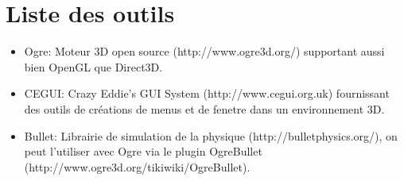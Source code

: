 \documentclass{report}
\begin{document}
    \section{Liste des outils}
    \begin{itemize}
        \item Ogre: Moteur 3D open source (http://www.ogre3d.org/) supportant aussi bien OpenGL que Direct3D. 
        \item CEGUI: Crazy Eddie's GUI System (http://www.cegui.org.uk) fournissant des outils de créations de menus et de fenetre dans un environnement 3D.
        \item Bullet: Librairie de simulation de la physique (http://bulletphysics.org/), on peut l'utiliser avec Ogre via le plugin OgreBullet (http://www.ogre3d.org/tikiwiki/OgreBullet).
    \end{itemize}
\end{document}
